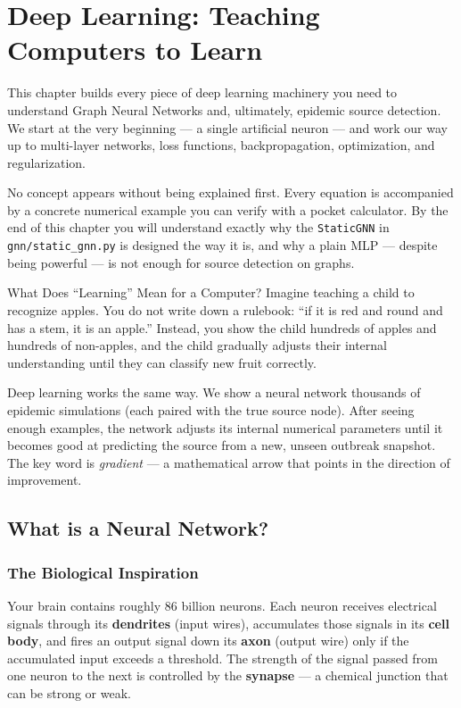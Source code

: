 \chapter{Deep Learning: Teaching Computers to Learn}

This chapter builds every piece of deep learning machinery you need to understand Graph Neural Networks and, ultimately, epidemic source detection. We start at the very beginning --- a single artificial neuron --- and work our way up to multi-layer networks, loss functions, backpropagation, optimization, and regularization.

No concept appears without being explained first. Every equation is accompanied by a concrete numerical example you can verify with a pocket calculator. By the end of this chapter you will understand exactly why the \texttt{StaticGNN} in \texttt{gnn/static\_gnn.py} is designed the way it is, and why a plain MLP --- despite being powerful --- is not enough for source detection on graphs.

\begin{analogybox}{What Does ``Learning'' Mean for a Computer?}
Imagine teaching a child to recognize apples. You do not write down a rulebook: ``if it is red and round and has a stem, it is an apple.'' Instead, you show the child hundreds of apples and hundreds of non-apples, and the child gradually adjusts their internal understanding until they can classify new fruit correctly.

Deep learning works the same way. We show a neural network thousands of epidemic simulations (each paired with the true source node). After seeing enough examples, the network adjusts its internal numerical parameters until it becomes good at predicting the source from a new, unseen outbreak snapshot. The key word is \emph{gradient} --- a mathematical arrow that points in the direction of improvement.
\end{analogybox}

\section{What is a Neural Network?}
\label{sec:what_is_nn}

\subsection{The Biological Inspiration}

Your brain contains roughly 86 billion neurons. Each neuron receives electrical signals through its \textbf{dendrites} (input wires), accumulates those signals in its \textbf{cell body}, and fires an output signal down its \textbf{axon} (output wire) only if the accumulated input exceeds a threshold. The strength of the signal passed from one neuron to the next is controlled by the \textbf{synapse} --- a chemical junction that can be strong or weak.


